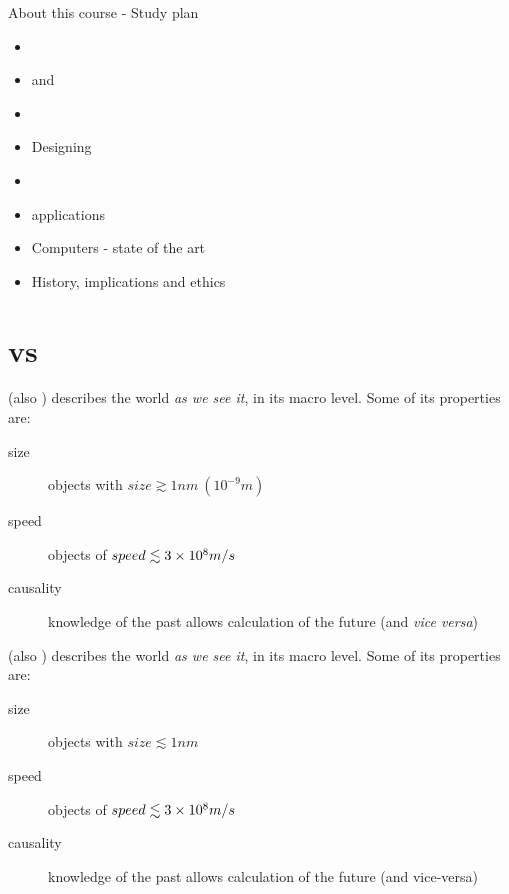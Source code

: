 \documentclass[aspectratio=43]{beamer}
\begin{document}
\begin{frame}{About this course - Study plan}
\begin{card}
    \begin{itemize}
        \item {}
        \item \qk and \ibmq
        \item \qi
        \item Designing \qcts
        \item \qa
        \item \qc applications
        \item \q Computers - state of the art
        \item History, implications and ethics
    \end{itemize}
\end{card}
\pagenumber
\end{frame}

\section{\qp vs \cp}

\begin{frame}{\cp}
\begin{card}
    \cp (also \cm) describes the world \textit{as we see it}, in its macro level. Some of its properties are:
    \begin{description}
        \item[size] objects with $size \gtrsim 1nm\ (10^{-9}m)$
        \item[speed] objects of $speed \lesssim 3 \times 10^{8} m/s$
        \item[causality] knowledge of the past allows calculation of the future (and \textit{vice versa})
    \end{description}
\end{card}
\pagenumber
\end{frame}


\begin{frame}{\qp}
\begin{card}
    \qp (also \qm) describes the world \textit{as we see it}, in its macro level. Some of its properties are:
    \begin{description}
        \item[size] objects with $size \lesssim 1nm$
        \item[speed] objects of $speed \lesssim 3 \times 10^{8} m/s$
        \item[causality] knowledge of the past allows calculation of the future (and vice-versa)
    \end{description}
\end{card}
\pagenumber
\end{frame}
\end{document}
